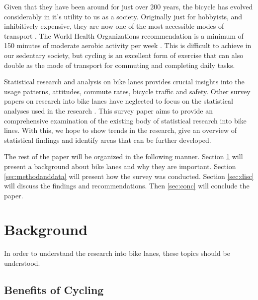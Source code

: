 \documentclass[12pt, letterpaper]{article}
\begin{document}
Given that they have been around for just over 200 years, the bicycle has  evolved considerably in it's utility to us as a society. Originally just for hobbyists, and inhibitively expensive, they are now one of the most accessible modes of transport \cite{BIKE2023}. The World Health Organizations recommendation is a minimum of 150 minutes of moderate aerobic activity per week \citep{WHO2020}. This is difficult to achieve in our sedentary society, but cycling is an excellent form of exercise that can also double as the mode of transport for commuting and completing daily tasks. \par
Statistical research and analysis on bike lanes provides crucial insights into the usage patterns, attitudes, commute rates, bicycle traffic and safety. Other survey papers on research into bike lanes have neglected to focus on the statistical analyses used in the research \cite{7Mlenberg2019}. This survey paper aims to provide an comprehensive examination of the existing body of statistical research into bike lines. With this, we hope to show trends in the research, give an overview of statistical findings and identify areas that can be further developed. \par
The rest of the paper will be organized in the following manner. Section \ref{sec:Background} will present a background about bike lanes and why they are important. Section \ref{sec:methodanddata} will present how the survey was conducted. Section \ref{sec:disc} will discuss the findings and recommendations. Then \ref{sec:conc} will conclude the paper.


\section{Background}
\label{sec:Background}

In order to understand the research into bike lanes, these topics should be understood. 

\subsection{Benefits of Cycling}
\label{sec:benefit}
\end{document}
